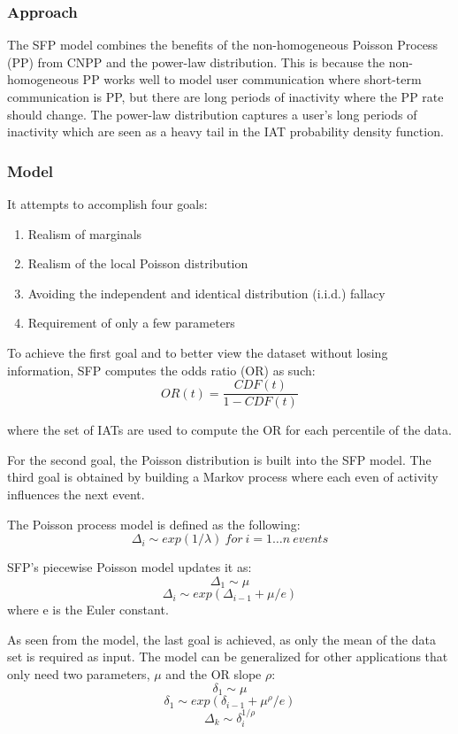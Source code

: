 \documentclass[11pt, oneside]{article}   	%
\begin{document}
\subsubsection*{Approach}

\quad The SFP model combines the benefits of the non-homogeneous Poisson Process (PP) from CNPP and the power-law distribution.
This is because the non-homogeneous PP works well to model user communication where short-term communication is PP, but there are long periods of inactivity where the PP rate should change.
The power-law distribution captures a user's long periods of inactivity which are seen as a heavy tail in the IAT probability density function.

\subsubsection*{Model}

It attempts to accomplish four goals:
\begin{enumerate}
	\item Realism of marginals
	\item Realism of the local Poisson distribution
	\item Avoiding the independent and identical distribution (i.i.d.) fallacy
	\item Requirement of only a few parameters
\end{enumerate}

To achieve the first goal and to better view the dataset without losing information, SFP computes the odds ratio (OR) as such:
$$ OR(t) = \frac{CDF(t)}{1-CDF(t)} $$

where the set of IATs are used to compute the OR for each percentile of the data.

For the second goal, the Poisson distribution is built into the SFP model.
The third goal is obtained by building a Markov process where each even of activity influences the next event.

The Poisson process model is defined as the following:
$$ \Delta_i \sim exp(1/ \lambda) \ for \ i = 1 \dots n \ events $$

SFP's piecewise Poisson model updates it as:
$$ \Delta_1 \sim \mu $$
$$ \Delta_i \sim exp(\Delta_{i-1} + \mu / e) $$
where e is the Euler constant.

As seen from the model, the last goal is achieved, as only the mean of the data set is required as input.
The model can be generalized for other applications that only need two parameters, $\mu$ and the OR slope $\rho$:
$$ \delta_1 \sim \mu $$
$$ \delta_1 \sim exp(\delta_{i-1} + \mu^{\rho} / e) $$
$$ \Delta_k \sim \delta_i^{1/ \rho} $$
\end{document}
